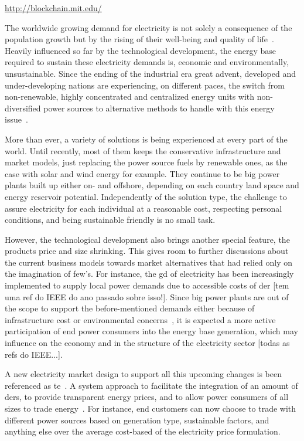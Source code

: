 \href{http://blockchain.mit.edu/}{\Huge http://blockchain.mit.edu/}

The worldwide growing demand for electricity is not solely a consequence of the population growth but by the rising of their well-being and quality of life~\cite{UN-SDG, IEA2017}.
Heavily influenced so far by the technological development, the energy base required to sustain these electricity demands is, economic and environmentally, unsustainable.
Since the ending of the industrial era great advent, 
developed and under-developing nations are experiencing, on different paces, the switch from non-renewable, highly concentrated and centralized energy units with non-diversified power sources to alternative methods to handle with this energy issue~\cite{toffler1980}.

More than ever, a variety of solutions is being experienced at every part of the world.
Until recently, most of them keeps the conservative infrastructure and market models, just replacing the power source fuels by renewable ones, as the case with solar and wind energy for example.
They continue to be big power plants built up either on- and offshore, depending on each country land space and energy reservoir potential.
Independently of the solution type, the challenge to assure electricity for each individual at a reasonable cost, respecting personal conditions, and being sustainable friendly is no small task.

However, the technological development also brings another special feature, the products price and size shrinking.
This gives room to further discussions about the current business models towards market alternatives that had relied only on the imagination of few's.
For instance, the \gls{gd} of electricity has been increasingly implemented to supply local power demands due to accessible costs of \gls{der} [tem uma ref do IEEE do ano passado sobre isso!].
Since big power plants are out of the scope to support the before-mentioned demands either because of infrastructure cost or environmental concerns~\cite{epe2014-2, castro2018},
it is expected a more active participation of end power consumers into the energy base generation,
which may influence on the economy and in the structure of the electricity sector [todas as refs do IEEE...].

A new electricity market design to support all this upcoming changes is been referenced as \gls{te}~\cite{olken2016}.
A system approach to facilitate the integration of an amount of \glspl{der},
to provide transparent energy prices, and
to allow power consumers of all sizes to trade energy~\cite{forfia2016}.
For instance, end customers can now choose to trade with different power sources based on generation type, sustainable factors, and anything else over the average cost-based of the electricity price formulation.

